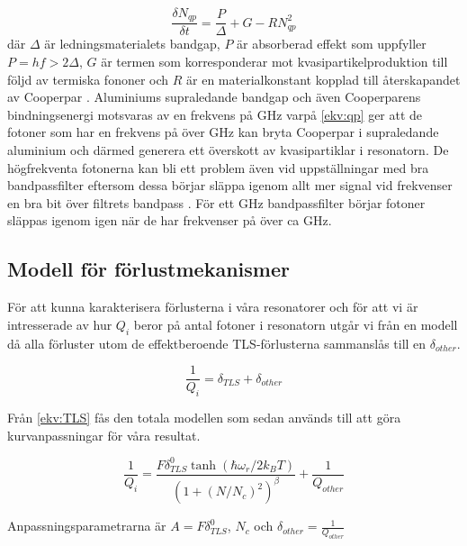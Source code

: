 \documentclass[main.tex]{subfiles}
\begin{document}
\begin{equation}
\label{ekv:qp}
    \frac{\delta N_{qp}}{\delta t}=\frac{P}{\Delta}+G-RN_{qp}^2
\end{equation}
där $\Delta$ är ledningsmaterialets bandgap, $P$ är absorberad effekt som uppfyller $P=hf>2\Delta$, $G$ är termen som korresponderar mot kvasipartikelproduktion till följd av termiska fononer och $R$ är en materialkonstant kopplad till återskapandet av Cooperpar \cite{Barends2011}. Aluminiums supraledande bandgap och även Cooperparens bindningsenergi motsvaras av en frekvens på \unit[88]{GHz} varpå \eqref{ekv:qp} ger att de fotoner som har en frekvens på över \unit[88]{GHz} kan bryta Cooperpar i supraledande aluminium och därmed generera ett överskott av kvasipartiklar i resonatorn.
De högfrekventa fotonerna kan bli ett problem även vid uppställningar med bra bandpassfilter eftersom dessa börjar släppa igenom allt mer signal vid frekvenser en bra bit över filtrets bandpass \cite{santavicca2008}. För ett \unit[4-8]{GHz} bandpassfilter börjar fotoner släppas igenom igen när de har frekvenser på över ca \unit[20]{GHz}.

\subsection{Modell för förlustmekanismer}
För att kunna karakterisera förlusterna i våra resonatorer och för att vi är intresserade av hur $Q_i$ beror på antal fotoner i resonatorn utgår vi från en modell då alla förluster utom de effektberoende TLS-förlusterna sammanslås till en $\delta_{other}$.

\begin{equation*}
    \frac{1}{Q_i}=\delta_{TLS}+\delta_{other}
\end{equation*}
\noindent

Från \ref{ekv:TLS} fås den totala modellen som sedan används till att göra kurvanpassningar för våra resultat.

\begin{equation}
    \label{ekv:TLSmodel}
    \frac{1}{Q_i}=\frac{F\delta_{TLS}^0\tanh{(\hbar\omega_r/2k_BT)}}{(1+(N/N_c)^2)^\beta}+\frac{1}{Q_{other}}
\end{equation}

Anpassningsparametrarna är $A=F\delta_{TLS}^0$, $N_c$ och $\delta_{other}=\frac{1}{Q_{other}}$
\end{document}
